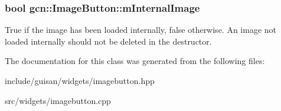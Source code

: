 \subsubsection[{\texorpdfstring{m\+Internal\+Image}{mInternalImage}}]{\setlength{\rightskip}{0pt plus 5cm}bool gcn\+::\+Image\+Button\+::m\+Internal\+Image\hspace{0.3cm}{\ttfamily [protected]}}\hypertarget{classgcn_1_1ImageButton_a0e8f9179ab310d84934f1093caa66eb6}{}\label{classgcn_1_1ImageButton_a0e8f9179ab310d84934f1093caa66eb6}
True if the image has been loaded internally, false otherwise. An image not loaded internally should not be deleted in the destructor. 

The documentation for this class was generated from the following files\+:\begin{DoxyCompactItemize}
\item 
include/guisan/widgets/imagebutton.\+hpp\item 
src/widgets/imagebutton.\+cpp\end{DoxyCompactItemize}

